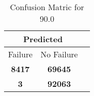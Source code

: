 \begin{table}[] 
\caption{Confusion Matric for 90.0} 
\label{Table: Prediction Accuracy-DMD90.0OnlySunEKF-ignoreReflection200.9EKF-top2-Reflection} 
\centering 
\begin{tabular} 
 {@{}ccc@{}} 
\toprule 
\multicolumn{2}{c}{\textbf{Predicted}}
 \\ \midrule 
\multicolumn{1}{|c|}{Failure} & 
\multicolumn{1}{c|}{No Failure}
 \\ \midrule 
\multicolumn{1}{|c|}{\color{green}\textbf{8417}} & 
\multicolumn{1}{c|}{\color{red}\textbf{69645}}
 \\ \midrule 
\multicolumn{1}{|c|}{\color{red}\textbf{3}} & 
\multicolumn{1}{c|}{\color{green}\textbf{92063}}
 \\ \bottomrule 
\end{tabular} 
\end{table} 
